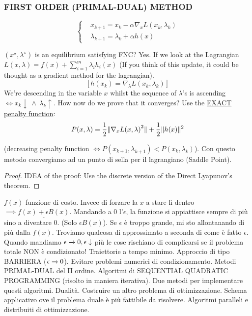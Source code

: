 \subsubsection{FIRST ORDER (PRIMAL-DUAL) METHOD}

\[
	\left\{
	\begin{aligned}
	&x_{k+1} = x_k - \alpha\nabla_x{L(x_k,\lambda_k)}\\
	&\lambda_{k+1} = \lambda_k + \alpha h(x)
	\end{aligned}
	\right.
\]

$(x^\star,\lambda^\star)$ is an equilibrium satisfying FNC? Yes. If we look at the Lagrangian $L(x,\lambda)= f(x) + \sum_{i=1}^m{\lambda_ih_i(x)}$ (If you think of this update, it could be thought as a gradient method for the lagrangian).
\[
	[h(x_k) = \nabla_\lambda{L(x_k,\lambda_k)}]
\]
We're descending in the variable $x$ whilst the sequence of $\lambda$'s is ascending $\iff x_k \downarrow\ \land\ \lambda_k \uparrow$.
How now do we prove that it converges? Use the \underline{EXACT penalty function}:
\[
	P(x,\lambda) = \frac{1}{2}\lVert\nabla_x{L(x,\lambda)}^2\rVert + \frac{1}{2}\lVert h(x)\rVert^2
\]

(decreasing penalty function $\iff P(x_{k+1},\lambda_{k+1}) < P(x_k,\lambda_k)$). Con questo metodo convergiamo ad un punto di sella per il lagrangiano (Saddle Point).

\begin{proof}
IDEA of the proof: Use the discrete version of the Direct Lyapunov's theorem.
\end{proof}

$f(x)$ funzione di costo. Invece di forzare la $x$ a stare lì dentro $\implies \underline{f(x)+\epsilon B(x)}$. Mandando a 0 l'$\epsilon$, la funzione si appiattisce sempre di più sino a diventare 0. (Solo $\epsilon B(x)$). Se $\epsilon$ è troppo grande, mi sto allontanando di più dalla $f(x)$. Troviamo qualcosa di approssimato a seconda di come è fatto $\epsilon$. Quando mandiamo $\epsilon\tendsto{}0, \epsilon\downarrow$ più le cose rischiano di complicarsi se il problema totale NON è condizionato! Traiettorie a tempo minimo. Approccio di tipo BARRIERA ($\epsilon\tendsto{}0$). Evitare problemi numerici di condizionamento.
Metodi PRIMAL-DUAL del II ordine. Algoritmi di SEQUENTIAL QUADRATIC PROGRAMMING (risolto in maniera iterativa). Due metodi per implementare questi algoritmi. Dualità. Costruire un altro problema di ottimizzazione. Schema applicativo ove il problema duale è più fattibile da risolvere. Algoritmi paralleli e distribuiti di ottimizzazione.

